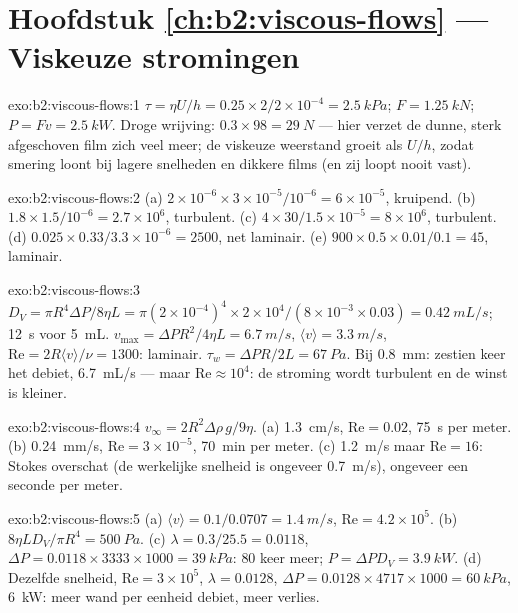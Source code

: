 \section*{Hoofdstuk \ref{ch:b2:viscous-flows} --- Viskeuze stromingen}

\begin{solution}{exo:b2:viscous-flows:1}
$\tau = \eta U/h = 0.25 \times 2/2 \times 10^{-4} = \qty{2.5}{kPa}$;
$F = \qty{1.25}{kN}$; $P = Fv = \qty{2.5}{kW}$. Droge wrijving:
$0.3 \times 98 = \qty{29}{N}$ --- hier verzet de dunne, sterk afgeschoven
film zich veel meer; de viskeuze weerstand groeit als $U/h$, zodat smering
loont bij lagere snelheden en dikkere films (en zij loopt nooit vast).
\end{solution}

\begin{solution}{exo:b2:viscous-flows:2}
(a) $2 \times 10^{-6} \times 3 \times 10^{-5}/10^{-6} = 6 \times 10^{-5}$,
kruipend. (b) $1.8 \times 1.5/10^{-6} = 2.7 \times 10^6$, turbulent. (c)
$4 \times 30/1.5 \times 10^{-5}
= 8 \times 10^6$, turbulent. (d)
$0.025 \times 0.33/3.3 \times 10^{-6} = 2500$, net laminair. (e)
$900 \times 0.5 \times 0.01/0.1 = 45$, laminair.
\end{solution}

\begin{solution}{exo:b2:viscous-flows:3}
$D_V = \pi R^4\Delta P/8\eta L = \pi(2 \times 10^{-4})^4 \times 2 \times 10^4/(8 \times 10^{-3}
\times 0.03) = \qty{0.42}{mL/s}$;
\qty{12}{s} voor \qty{5}{mL}.
$v_{\max} = \Delta PR^2/
4\eta L = \qty{6.7}{m/s}$,
$\langle v\rangle = \qty{3.3}{m/s}$,
$\mathrm{Re} = 2R\langle v
\rangle/\nu = 1300$: laminair.
$\tau_w = \Delta PR/2L = \qty{67}{Pa}$. Bij \qty{0.8}{mm}: zestien keer het
debiet, \qty{6.7}{mL/s} --- maar $\mathrm{Re} \approx 10^4$: de stroming
wordt turbulent en de winst is kleiner.
\end{solution}

\begin{solution}{exo:b2:viscous-flows:4}
$v_\infty = 2R^2\Delta\rho\,g/9\eta$. (a) \qty{1.3}{cm/s},
$\mathrm{Re} = 0.02$, \qty{75}{s} per meter. (b) \qty{0.24}{mm/s},
$\mathrm{Re} = 3 \times 10^{-5}$, \qty{70}{min} per meter. (c)
\qty{1.2}{m/s} maar $\mathrm{Re} = 16$: Stokes overschat (de werkelijke
snelheid is ongeveer \qty{0.7}{m/s}), ongeveer een seconde per meter.
\end{solution}

\begin{solution}{exo:b2:viscous-flows:5}
(a) $\langle v\rangle = 0.1/0.0707 = \qty{1.4}{m/s}$,
$\mathrm{Re} = 4.2 \times 10^5$. (b) $8\eta LD_V/\pi R^4 = \qty{500}{Pa}$.
(c) $\lambda = 0.3/25.5 = 0.0118$,
$\Delta P = 0.0118
\times 3333 \times 1000 = \qty{39}{kPa}$: $80$ keer meer;
$P = \Delta PD_V = \qty{3.9}{kW}$. (d) Dezelfde snelheid,
$\mathrm{Re} = 3 \times 10^5$, $\lambda = 0.0128$,
$\Delta P = 0.0128 \times 4717
\times 1000 = \qty{60}{kPa}$, \qty{6}{kW}:
meer wand per eenheid debiet, meer verlies.
\end{solution}

